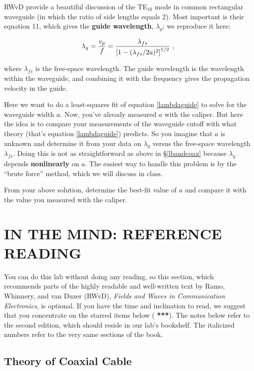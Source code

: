 \documentclass[12pt,preprint]{aastex}
\begin{document}
	RWvD provide a beautiful discussion of the TE$_{10}$ mode in
common rectangular waveguide (in which the ratio of side lengths equals
2).  Most important is their equation 11, which gives the {\bf guide
wavelength}, $\lambda_g$; we reproduce it here:

\begin{equation} \label{lambdaguide}
\lambda_g = {v_p \over f} = {\lambda_{fs} \over \left[ 1 - (\lambda_{fs}/2a)^2
\right]^{1/2} } \ ,
\end{equation}

\noindent where $\lambda_{fs}$ is the free-space wavelength.  The guide
wavelength is the wavelength within the waveguide, and combining it with
the frequency gives the propagation velocity in the guide. 

Here we want to do a least-squares fit of equation \ref{lambdaguide} to
solve for the waveguide width $a$. Now, you've already measured $a$ with
the caliper. But here the idea is to compare your measurements of the
waveguide cutoff with what theory (that's equation \ref{lambdaguide})
predicts. So you imagine that $a$ is unknown and determine it from your
data on $\lambda_g$ versus the free-space wavelength $\lambda_{fs}$.
Doing this is not as straightforward as above in \S \ref{lbandcoax}
because $\lambda_g$ depends {\bf nonlinearly} on $a$. The easiest way to
handle
this problem is by the ``brute force'' method, which we will discuss in
class. 

	From your above solution, determine the best-fit value of $a$
and compare it with the value you measured with the caliper.

\section {IN THE MIND: REFERENCE READING} \label{RWvD}

You can do this lab without doing any reading, so this section, which
recommends parts of the highly readable and well-written text by Ramo,
Whinnery, and van Duzer (RWvD), {\it Fields and Waves in Communication
  Electronics}, is optional. If you have the time and inclination to
read, we suggest that you concentrate on the starred items below ({\bf
  ***}).  The notes below refer to the second edition, which should
reside in our lab's bookshelf. The italicized numbers refer to the very
same sections of the book.

\subsection{ Theory of Coaxial Cable}
	
\end{document}
